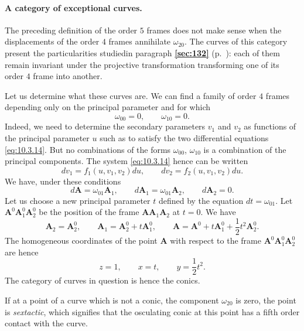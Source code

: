 \documentclass[leqno,11pt]{book}
\numberwithin{equation}{chapter}
\theoremstyle{shape1}
\theoremstyle{shapesmall}
\newcommand{\fsref}[1]{{\rm\textsection\textbf{\ref{sec:#1}}}}
\begin{document}
\paragraph{A category of exceptional curves.}
\label{sec:147}
The preceding definition of the order $5$ frames does not make sense when the displacements of the order $4$ frames annihilate $\omega_{20}$. The curves of this category present the particularities studiedin paragraph \fsref{132} (p.~\pageref{sec:132}): each of them remain invariant under the projective transformation transforming one of its order $4$ frame into another.

Let us determine what these curves are. We can find a family of order $4$ frames depending only on the principal parameter and for which
\begin{equation}
  \label{eq:10.3.14}
  \omega_{00}=0,\qquad\omega_{10}=0.
\end{equation}
Indeed, we need to determine the secondary parameters $v_{1}$ and $v_{2}$ as functions of the principal parameter $u$ such as to satisfy the two differential equations \eqref{eq:10.3.14}. But no combinations of the forms $\omega_{00}$, $\omega_{10}$ is a combination of the principal components. The system \eqref{eq:10.3.14} hence can be written
\[
dv_{1}=f_{1}(u,v_{1},v_{2})du,\qquad dv_{2}=f_{2}(u,v_{1},v_{2})du.
\]
We have, under these conditions
\[
d\mathbf{A}=\omega_{01}\mathbf{A}_{1},\qquad d\mathbf{A}_{1}=\omega_{01}\mathbf{A}_{2},\qquad d\mathbf{A}_{2}=0.
\]
Let us choose a new principal parameter $t$ defined by the equation $dt=\omega_{01}$. Let $\mathbf{A}^{0}\mathbf{A}^{0}_{1}\mathbf{A}^{0}_{2}$ be the position of the frame $\mathbf{AA}_{1}\mathbf{A}_{2}$ at $t=0$. We have
\[
\mathbf{A}_{2}=\mathbf{A}^{0}_{2},\qquad\mathbf{A}_{1}=\mathbf{A}^{0}_{2}+t\mathbf{A}^{0}_{1},\qquad\mathbf{A}=\mathbf{A}^{0}+t\mathbf{A}^{0}_{1}+\frac{1}{2}t^{2}\mathbf{A}^{0}_{2}.
\]
The homogeneous coordinates of the point $\mathbf{A}$ with respect to the frame $\mathbf{A}^{0}\mathbf{A}^{0}_{1}\mathbf{A}^{0}_{2}$ are hence
\[
z=1,\qquad x=t,\qquad y=\frac{1}{2}t^{2}.
\] 
The category of curves in question is hence the conics.

If at a point of a curve which is not a conic, the component $\omega_{20}$ is zero, the point is \emph{sextactic}, which signifies that the osculating conic at this point has a fifth order contact with the curve.
\end{document}
